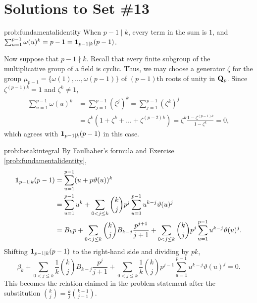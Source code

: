 \chapter*{Solutions to Set \#13}
\label{set12sols}

\begin{sol}{prob:fundamentalidentity}
When $p-1\mid k$, every term in the sum is $1$, and $\sum_{u=1}^{p-1} \omega(u)^{k} = p-1 = \mathbf{1}_{p-1\mid k} (p-1)$. 

Now suppose that $p-1\nmid k$.
Recall that every finite subgroup of the multiplicative group of a field is cyclic. Thus, we may choose a generator $\zeta$ for the group $\mu_{p-1} = \{\omega(1), \dots, \omega(p-1)\}$ of $(p-1)$th roots of unity in $\mathbf{Q}_p$. Since $\zeta^{(p-1)k} = 1$ and $\zeta^k \ne 1$,
\begin{align*} \sum_{u=1}^{p-1} \omega(u)^k &= \sum_{j=1}^{p-1} (\zeta^j)^k = \sum_{j=1}^{p-1} (\zeta^k)^j \\&= \zeta^k(1+\zeta^k + \dots + \zeta^{(p-2)k}) = \zeta^{k} \frac{1-\zeta^{(p-1)k}}{1-\zeta^{k}} = 0, \end{align*}
which agrees with $\mathbf{1}_{p-1\mid k} (p-1)$ in this case.
\end{sol}

\begin{sol}{prob:betakintegral} By Faulhaber's formula and Exercise \ref{prob:fundamentalidentity},
\begin{align*} \mathbf{1}_{p-1\mid k} (p-1) &= \sum_{u=1}^{p-1} (u + p\vartheta(u))^{k} \\
&= \sum_{u=1}^{p-1} u^k + \sum_{0< j \le k}\binom{k}{j} p^j \sum_{u=1}^{p-1} u^{k-j} \vartheta(u)^j \\
&= B_k p + \sum_{0< j \le k} \binom{k}{j} B_{k-j} \frac{p^{j+1}}{j+1} + \sum_{0< j \le k}\binom{k}{j} p^j \sum_{u=1}^{p-1} u^{k-j} \vartheta(u)^j.
\end{align*}
Shifting $\mathbf{1}_{p-1\mid k}(p-1)$ to the right-hand side and dividing by $pk$,
\[ \beta_k + \sum_{0< j\le k} \frac{1}{k}\binom{k}{j} B_{k-j} \frac{p^j}{j+1} + \sum_{0< j \le k}\frac{1}{k}\binom{k}{j}p^{j-1} \sum_{u=1}^{p-1} u^{k-j}\vartheta(u)^j=0. \]
This becomes the relation claimed in the problem statement after the substitution $\binom{k}{j} = \frac{k}{j} \binom{k-1}{j-1}$.
\end{sol}

